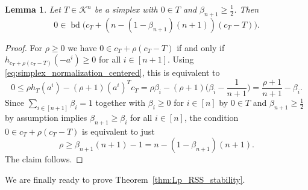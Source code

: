 \documentclass{amsart}
\newtheorem{lemma}[theorem]{Lemma}
\newcommand\CK{\mathcal{K}}
\DeclareMathOperator{\bd}{bd}
\begin{document}
\begin{lemma}\label{lem:simplex_reflection}
Let $T \in \CK^n$ be a simplex with $0 \in T$ and $\beta_{n+1} \geq \frac{1}{2}$.
Then
\[
    0
    \in \bd \big( c_T + ( n - (1-\beta_{n+1}) (n+1)) (c_T - T) \big).
\]
\end{lemma}
\begin{proof}
For $\rho \geq 0$ we have $0 \in c_T + \rho (c_T - T)$ if and only if $h_{c_T + \rho (c_T - T)}(-a^i) \geq 0$ for all $i \in [n+1]$.
Using \eqref{eq:simplex_normalization_centered}, this is equivalent to
\[
    0
    \leq \rho h_T(a^i) - (\rho + 1) (a^i)^T c_T
    = \rho \beta_i - (\rho + 1) \bigg( \beta_i - \frac{1}{n+1} \bigg)
    = \frac{\rho+1}{n+1} - \beta_i.
\]
Since $\sum_{i \in [n+1]} \beta_i = 1$ together with $\beta_i \geq 0$ for $i \in [n]$ by $0 \in T$ and $\beta_{n+1} \geq \frac{1}{2}$ by assumption implies $\beta_{n+1} \geq \beta_i$
for all $i \in [n]$,
the condition $0 \in c_T + \rho (c_T - T)$ is equivalent to just
\[
    \rho
    \geq \beta_{n+1} (n+1) - 1
    = n - (1 - \beta_{n+1}) (n+1).
\]
The claim follows.
\end{proof}



We are finally ready to prove Theorem~\ref{thm:Lp_RSS_stability}.
\end{document}

